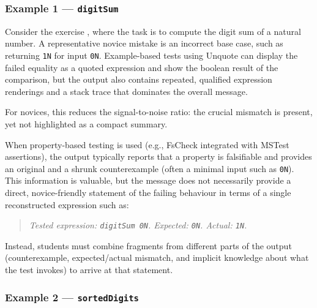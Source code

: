 \subsubsection{Example 1 --- \texttt{digitSum}} %
        \label{Example 1 digitSum} %


\begin{justify}
Consider the exercise , where the task is to compute the digit
sum of a natural number. A representative novice mistake is an incorrect base case, such as
returning \texttt{1N} for input \texttt{0N}. Example-based tests using Unquote can display the
failed equality as a quoted expression and show the boolean result of the comparison, but the output
also contains repeated, qualified expression renderings and a stack trace that dominates the overall
message.

For novices, this reduces the signal-to-noise ratio: the crucial mismatch is present, yet not
highlighted as a compact summary.

When property-based testing is used (e.g., FsCheck integrated with MSTest assertions), the output
typically reports that a property is falsifiable and provides an original and a shrunk
counterexample (often a minimal input such as \texttt{0N}). This information is valuable, but the
message does not necessarily provide a direct, novice-friendly statement of the failing behaviour in
terms of a single reconstructed expression such as:

\begin{quote}
    \emph{Tested expression: \texttt{digitSum 0N}. Expected: \texttt{0N}. Actual: \texttt{1N}.}
\end{quote}

Instead, students must combine fragments from different parts of the output (counterexample,
expected/actual mismatch, and implicit knowledge about what the test invokes) to arrive at that
statement.
\end{justify}


\subsubsection{Example 2 --- \texttt{sortedDigits}} %
        \label{Example 2 sortedDigits} %


